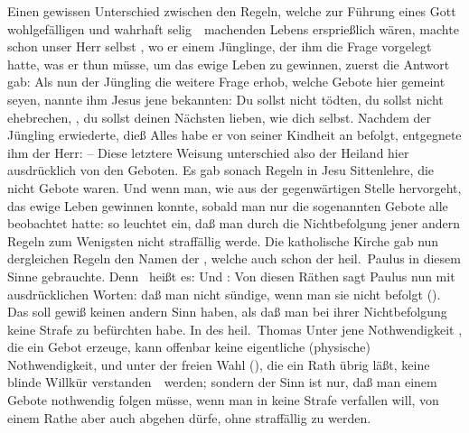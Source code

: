 Einen gewissen Unterschied zwischen den Regeln, welche zur Führung  eines Gott wohlgefälligen und wahrhaft selig~\ machenden Lebens ersprießlich wären, machte schon unser Herr selbst , wo er einem Jünglinge, der ihm die Frage vorgelegt hatte, was er thun müsse, um das ewige Leben zu gewinnen, zuerst die Antwort gab:  Als nun der Jüngling die weitere Frage erhob, welche Gebote hier gemeint seyen, nannte ihm Jesus jene bekannten: Du sollst nicht tödten, du sollst nicht ehebrechen, \udgl , du sollst deinen Nächsten lieben, wie dich selbst. Nachdem der Jüngling erwiederte, dieß Alles habe er von seiner Kindheit an befolgt, entgegnete ihm der Herr:  -- Diese letztere Weisung unterschied also der Heiland hier ausdrücklich von den Geboten. Es gab sonach Regeln in Jesu Sittenlehre, die nicht Gebote waren. Und wenn man, wie aus der gegenwärtigen Stelle hervorgeht, das ewige Leben gewinnen konnte, sobald man nur die sogenannten Gebote alle beobachtet hatte: so leuchtet ein, daß man durch die Nichtbefolgung jener andern Regeln zum Wenigsten nicht straffällig werde. Die katholische Kirche gab nun dergleichen Regeln den Namen der , welche auch schon der heil.\ Paulus in diesem Sinne gebrauchte. Denn \ heißt es:  Und :  Von diesen Räthen sagt Paulus nun mit ausdrücklichen Worten: daß man nicht sündige, wenn man sie nicht befolgt (). Das soll gewiß keinen andern Sinn haben, als daß man bei ihrer Nichtbefolgung keine Strafe zu befürchten habe. In des heil.\ Thomas 
Unter jene Nothwendigkeit , die ein Gebot erzeuge, kann offenbar keine eigentliche (physische) Nothwendigkeit, und unter der freien Wahl (), die ein Rath übrig läßt, keine blinde Willkür verstanden~\ werden; sondern der Sinn ist nur, daß man einem Gebote nothwendig folgen müsse, wenn man in keine Strafe verfallen will, von einem Rathe aber auch abgehen dürfe, ohne straffällig zu werden.


